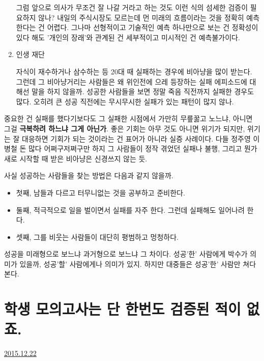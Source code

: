 \begin{enumerate}
    그럼 앞으로 의사가 무조건 잘 나갈 거라고 하는 것도 이런 식의 섬세한 검증이 필요하지 않나?
    내일의 주식시장도 모르는데 먼 미래의 흐름이라는 것을 정확히 예측한다는 건 어렵다.
    그나마 선형적이고 기술적인 예측 하나만으로 보는 건 정확성이 있다 해도 '개인의 장래'와 관계된 건 세부적이고 미시적인 건 예측불가이다.
    \vspace{5mm}

    \item 인생 재단
    \vspace{5mm}

    자식이 재수하거나 삼수하는 등 20대 때 실패하는 경우에 비아냥을 많이 받는다.
    그런데 그 비아냥거리는 사람들은 왜 위인전에 으레 등장하는 실패 에피소드에 대해선 말을 하지 않을까.
    성공한 사람들을 보면 정말 죽음 직전까지 실패한 경우도 많다.
    오히려 큰 성공 직전에는 무시무시한 실패가 있는 패턴이 많지 않나.
    \vspace{5mm}

\end{enumerate}

중요한 건 실패를 했다기보다도 그 실패한 시점에서 가만히 무릎꿇고 노느냐, 아니면 그걸 \textbf{극복하려 하느냐 그게 아닌가}.
좋은 기회는 아무 것도 아니면 위기가 되지만, 위기는 잘 대응하면 기회가 되는 것이라는 건 표어가 아니라 실증 사례이다.
다들 정주영 이병철 돈 많다 어쩌구저쩌구만 하지 그 사람들이 정작 겪었던 실패나 불행, 그리고 뭔가 새로 시작할 때 받은 비아냥은 신경쓰지 않는 듯.
\vspace{5mm}

사실 성공하는 사람들을 찾는 방법은 다음과 같지 않을까.
\vspace{5mm}

\begin{itemize}
    \item 첫째, 남들과 다르고 터무니없는 것을 공부하고 준비한다.
    \item 둘째, 적극적으로 일을 벌이면서 실패를 자주 한다. 그런데 실패해도 일어나려 한다.
    \item 셋째, 그를 비웃는 사람들이 대단히 평범하고 멍청하다.
\end{itemize}
\vspace{5mm}

성공을 미래형으로 보느냐 과거형으로 보느냐 그 차이다.
성공'한' 사람에게 박수가 의미가 있을까, 성공'할' 사람에게나 의미가 있지.
하지만 대중들은 성공'한' 사람만 쳐다본다.
\vspace{5mm}






\section{학생 모의고사는 단 한번도 검증된 적이 없죠.}
\href{https://www.kockoc.com/Apoc/558076}{2015.12.22}

